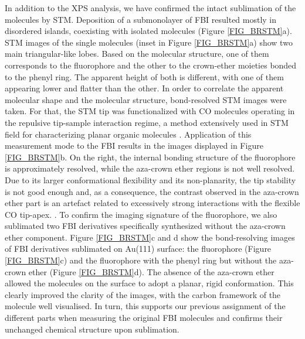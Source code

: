 \documentclass[aps,prl,reprint,longbibliography,superscriptaddress, english]{revtex4-1}
\begin{document}
In addition to the XPS analysis, we have confirmed the intact sublimation of the molecules by STM. Deposition of a submonolayer of FBI resulted mostly in disordered islands, coexisting with isolated molecules (Figure {\ref{FIG_BRSTM}a}). STM images of the single molecules (inset in Figure  {\ref{FIG_BRSTM}a}) show two main triangular-like lobes. Based on the molecular structure, one of them corresponds to the fluorophore and the other to the crown-ether moieties bonded to the phenyl ring. The apparent height of both is different, with one of them appearing lower and flatter than the other. In order to correlate the apparent molecular shape and the molecular structure, bond-resolved STM images were taken. For that, the STM tip was functionalized with CO molecules operating in the repulsive tip-sample interaction regime, a method extensively used in STM field for characterizing planar organic molecules \cite{gross_recent_2011,gross_atomic_2018}. Application of this measurement mode to the FBI results in the images displayed in Figure \ref{FIG_BRSTM}b. On the right, the internal bonding structure of the fluorophore is approximately resolved, while the aza-crown ether regions is not well resolved. Due to its larger conformational flexibility and its non-planarity, the tip stability is not good enough and, as a consequence, the contrast observed in the aza-crown ether part is an artefact related to excessively strong interactions with the flexible CO tip-apex. \cite{moll_mechanisms_2010,hapala_mechanism_2014}. To confirm the imaging signature of the fluorophore, we also sublimated two FBI derivatives specifically synthesized without the aza-crown ether component. Figure \ref{FIG_BRSTM}c and d show the bond-resolving images of FBI derivatives sublimated on Au(111) surface: the fluorophore (Figure {\ref{FIG_BRSTM}c}) and the fluorophore with the phenyl ring but without the aza-crown ether (Figure {\ref{FIG_BRSTM}d}). The absence of the aza-crown ether allowed the molecules on the surface to adopt a planar, rigid conformation. This clearly improved the clarity of the images, with the carbon framework of the molecule well visualised. In turn, this supports our previous assignment of the different parts when measuring the original FBI molecules and confirms their unchanged chemical structure upon sublimation.  
\end{document}
